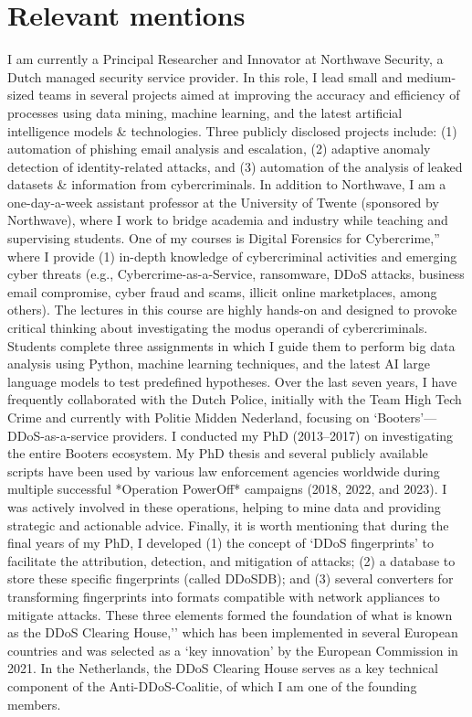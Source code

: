 \documentclass[print]{styles/friggeri-cv-mac} %
\begin{document}
\section{Relevant mentions}\vspace{-10pt}
I am currently a Principal Researcher and Innovator at Northwave Security, a Dutch managed security service provider. In this role, I lead small and medium-sized teams in several projects aimed at improving the accuracy and efficiency of processes using data mining, machine learning, and the latest artificial intelligence models \& technologies. Three publicly disclosed projects include: (1) automation of phishing email analysis and escalation, (2) adaptive anomaly detection of identity-related attacks, and (3) automation of the analysis of leaked datasets \& information from cybercriminals.
%
\newline
In addition to Northwave, I am a one-day-a-week assistant professor at the University of Twente (sponsored by Northwave), where I work to bridge academia and industry while teaching and supervising students. One of my courses is Digital Forensics for Cybercrime,'' where I provide (1) in-depth knowledge of cybercriminal activities and emerging cyber threats (e.g., Cybercrime-as-a-Service, ransomware, DDoS attacks, business email compromise, cyber fraud and scams, illicit online marketplaces, among others). The lectures in this course are highly hands-on and designed to provoke critical thinking about investigating the modus operandi of cybercriminals. Students complete three assignments in which I guide them to perform big data analysis using Python, machine learning techniques, and the latest AI large language models to test predefined hypotheses.   
% 
\newline   
Over the last seven years, I have frequently collaborated with the Dutch Police, initially with the Team High Tech Crime and currently with Politie Midden Nederland, focusing on `Booters'—DDoS-as-a-service providers. I conducted my PhD (2013--2017) on investigating the entire Booters ecosystem. My PhD thesis and several publicly available scripts have been used by various law enforcement agencies worldwide during multiple successful *Operation PowerOff* campaigns (2018, 2022, and 2023). I was actively involved in these operations, helping to mine data and providing strategic and actionable advice.   
% 
\newline   
Finally, it is worth mentioning that during the final years of my PhD, I developed (1) the concept of `DDoS fingerprints' to facilitate the attribution, detection, and mitigation of attacks; (2) a database to store these specific fingerprints (called DDoSDB); and (3) several converters for transforming fingerprints into formats compatible with network appliances to mitigate attacks. These three elements formed the foundation of what is known as the DDoS Clearing House,’’ which has been implemented in several European countries and was selected as a `key innovation’ by the European Commission in 2021. In the Netherlands, the DDoS Clearing House serves as a key technical component of the Anti-DDoS-Coalitie, of which I am one of the founding members.
\end{document}
